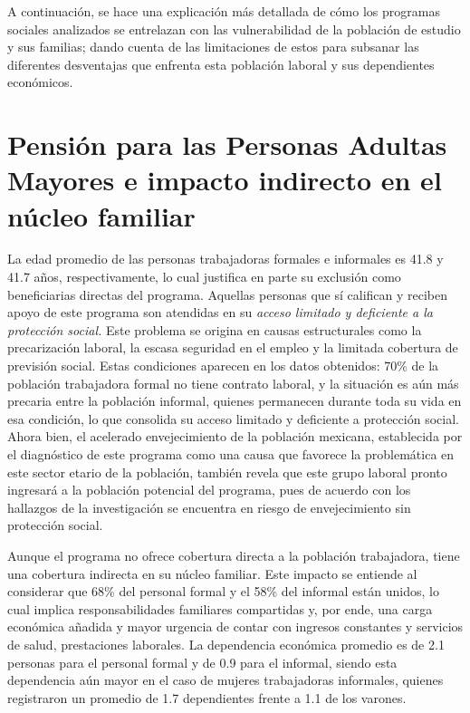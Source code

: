\documentclass[
  spanish,
  11.5pt,
  170mm x 240mmpaper,
]{scrbook}
\begin{document}
\endgroup

A continuación, se hace una explicación más detallada de cómo los
programas sociales analizados se entrelazan con las vulnerabilidad de la
población de estudio y sus familias; dando cuenta de las limitaciones de
estos para subsanar las diferentes desventajas que enfrenta esta
población laboral y sus dependientes económicos.

\section{Pensión para las Personas Adultas Mayores e impacto indirecto
en el núcleo
familiar}\label{pensiuxf3n-para-las-personas-adultas-mayores-e-impacto-indirecto-en-el-nuxfacleo-familiar}

La edad promedio de las personas trabajadoras formales e informales es
41.8 y 41.7 años, respectivamente, lo cual justifica en parte su
exclusión como beneficiarias directas del programa. Aquellas personas
que sí califican y reciben apoyo de este programa son atendidas en su
\emph{acceso limitado y deficiente a la protección social.} Este
problema se origina en causas estructurales como la precarización
laboral, la escasa seguridad en el empleo y la limitada cobertura de
previsión social. Estas condiciones aparecen en los datos obtenidos:
70\% de la población trabajadora formal no tiene contrato laboral, y la
situación es aún más precaria entre la población informal, quienes
permanecen durante toda su vida en esa condición, lo que consolida su
acceso limitado y deficiente a protección social. Ahora bien, el
acelerado envejecimiento de la población mexicana, establecida por el
diagnóstico de este programa como una causa que favorece la problemática
en este sector etario de la población, también revela que este grupo
laboral pronto ingresará a la población potencial del programa, pues de
acuerdo con los hallazgos de la investigación se encuentra en riesgo de
envejecimiento sin protección social.

Aunque el programa no ofrece cobertura directa a la población
trabajadora, tiene una cobertura indirecta en su núcleo familiar. Este
impacto se entiende al considerar que 68\% del personal formal y el 58\%
del informal están unidos, lo cual implica responsabilidades familiares
compartidas y, por ende, una carga económica añadida y mayor urgencia de
contar con ingresos constantes y servicios de salud, prestaciones
laborales. La dependencia económica promedio es de 2.1 personas para el
personal formal y de 0.9 para el informal, siendo esta dependencia aún
mayor en el caso de mujeres trabajadoras informales, quienes registraron
un promedio de 1.7 dependientes frente a 1.1 de los varones.
\end{document}
